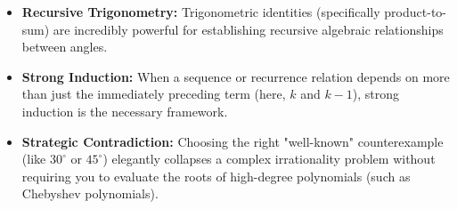 \begin{takeaways}
\begin{itemize}
    \item \textbf{Recursive Trigonometry:} Trigonometric identities (specifically product-to-sum) are incredibly powerful for establishing recursive algebraic relationships between angles. 
    \item \textbf{Strong Induction:} When a sequence or recurrence relation depends on more than just the immediately preceding term (here, $k$ and $k-1$), strong induction is the necessary framework.
    \item \textbf{Strategic Contradiction:} Choosing the right "well-known" counterexample (like $30^\circ$ or $45^\circ$) elegantly collapses a complex irrationality problem without requiring you to evaluate the roots of high-degree polynomials (such as Chebyshev polynomials).
\end{itemize}
\end{takeaways}
